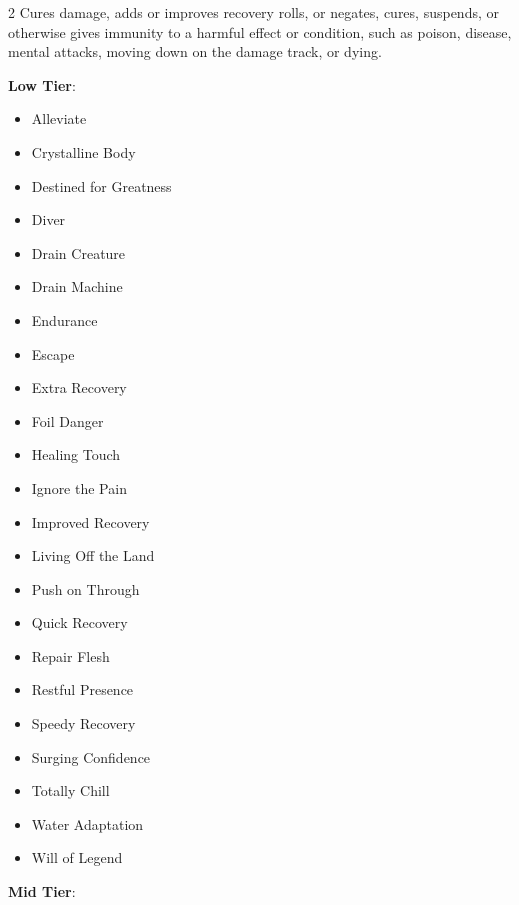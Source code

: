 \begin{multicols}{2}
Cures damage, adds or improves recovery rolls, or negates, cures, suspends, or otherwise gives immunity to a harmful effect or condition, such as poison, disease, mental attacks, moving down on the damage track, or dying.

\textbf{Low Tier}:

\begin{itemize}
\item Alleviate
\item Crystalline Body
\item Destined for Greatness
\item Diver
\item Drain Creature
\item Drain Machine
\item Endurance
\item Escape
\item Extra Recovery
\item Foil Danger
\item Healing Touch
\item Ignore the Pain
\item Improved Recovery
\item Living Off the Land
\item Push on Through
\item Quick Recovery
\item Repair Flesh
\item Restful Presence
\item Speedy Recovery
\item Surging Confidence
\item Totally Chill
\item Water Adaptation
\item Will of Legend
\end{itemize}

\textbf{Mid Tier}:


\end{multicols}
